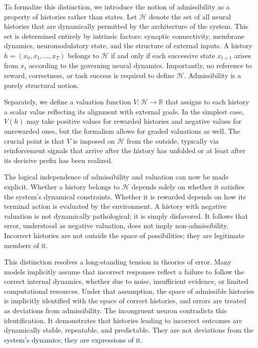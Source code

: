 \documentclass[11pt]{article}
\newcommand{\histories}{\mathcal{H}}
\newcommand{\valuation}{V}
\begin{document}
To formalize this distinction, we introduce the notion of admissibility as a property of histories rather than states. Let $\histories$ denote the set of all neural histories that are dynamically permitted by the architecture of the system. This set is determined entirely by intrinsic factors: synaptic connectivity, membrane dynamics, neuromodulatory state, and the structure of external inputs. A history $h = (x_0, x_1, \ldots, x_T)$ belongs to $\histories$ if and only if each successive state $x_{t+1}$ arises from $x_t$ according to the governing neural dynamics. Importantly, no reference to reward, correctness, or task success is required to define $\histories$. Admissibility is a purely structural notion.

Separately, we define a valuation function $\valuation : \histories \to \mathbb{R}$ that assigns to each history a scalar value reflecting its alignment with external goals. In the simplest case, $\valuation(h)$ may take positive values for rewarded histories and negative values for unrewarded ones, but the formalism allows for graded valuations as well. The crucial point is that $\valuation$ is imposed on $\histories$ from the outside, typically via reinforcement signals that arrive after the history has unfolded or at least after its decisive prefix has been realized.

The logical independence of admissibility and valuation can now be made explicit. Whether a history belongs to $\histories$ depends solely on whether it satisfies the system’s dynamical constraints. Whether it is rewarded depends on how its terminal action is evaluated by the environment. A history with negative valuation is not dynamically pathological; it is simply disfavored. It follows that error, understood as negative valuation, does not imply non-admissibility. Incorrect histories are not outside the space of possibilities; they are legitimate members of it.

This distinction resolves a long-standing tension in theories of error. Many models implicitly assume that incorrect responses reflect a failure to follow the correct internal dynamics, whether due to noise, insufficient evidence, or limited computational resources. Under that assumption, the space of admissible histories is implicitly identified with the space of correct histories, and errors are treated as deviations from admissibility. The incongruent neuron contradicts this identification. It demonstrates that histories leading to incorrect outcomes are dynamically stable, repeatable, and predictable. They are not deviations from the system’s dynamics; they are expressions of it.
\end{document}
